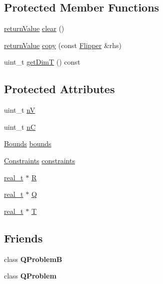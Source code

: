 \subsection*{Protected Member Functions}
\begin{DoxyCompactItemize}
\item 
\hyperlink{_message_handling_8hpp_a81d556f613bfbabd0b1f9488c0fa865e}{return\+Value} \hyperlink{class_flipper_a09841cd2ed9e5a18d23b5fd5bf95c211}{clear} ()
\item 
\hyperlink{_message_handling_8hpp_a81d556f613bfbabd0b1f9488c0fa865e}{return\+Value} \hyperlink{class_flipper_a42dc33c257f037e89b65a923d6d5b093}{copy} (const \hyperlink{class_flipper}{Flipper} \&rhs)
\item 
uint\+\_\+t \hyperlink{class_flipper_ac936afded1963bb26dfef0c16e5c23b1}{get\+DimT} () const
\end{DoxyCompactItemize}
\subsection*{Protected Attributes}
\begin{DoxyCompactItemize}
\item 
uint\+\_\+t \hyperlink{class_flipper_ab552c3e3a524753f39d3010e8c58a505}{nV}
\item 
uint\+\_\+t \hyperlink{class_flipper_a884a852b9295749ca360c6159033f307}{nC}
\item 
\hyperlink{class_bounds}{Bounds} \hyperlink{class_flipper_af6c5ae2f504cc9478ee07d824ba97801}{bounds}
\item 
\hyperlink{class_constraints}{Constraints} \hyperlink{class_flipper_a13587b75185673eeff26b9b1f5f9d94b}{constraints}
\item 
\hyperlink{qp_o_a_s_e_s__wrapper_8h_a0d00e2b3dfadee81331bbb39068570c4}{real\+\_\+t} $\ast$ \hyperlink{class_flipper_a8d49f4f458ba1b15de596695cd50d5aa}{R}
\item 
\hyperlink{qp_o_a_s_e_s__wrapper_8h_a0d00e2b3dfadee81331bbb39068570c4}{real\+\_\+t} $\ast$ \hyperlink{class_flipper_afae7213a4c38a150512faac9ac572ceb}{Q}
\item 
\hyperlink{qp_o_a_s_e_s__wrapper_8h_a0d00e2b3dfadee81331bbb39068570c4}{real\+\_\+t} $\ast$ \hyperlink{class_flipper_a5d401205baa5348982119da87a0ef4da}{T}
\end{DoxyCompactItemize}
\subsection*{Friends}
\begin{DoxyCompactItemize}
\item 
\mbox{\label{class_flipper_a3b75e152d72d75f5b515d40a28af177c}} 
class {\bfseries Q\+ProblemB}
\item 
\mbox{\label{class_flipper_a22dd8c6dfcdbb2f56b8b4bd9185322c0}} 
class {\bfseries Q\+Problem}
\end{DoxyCompactItemize}


